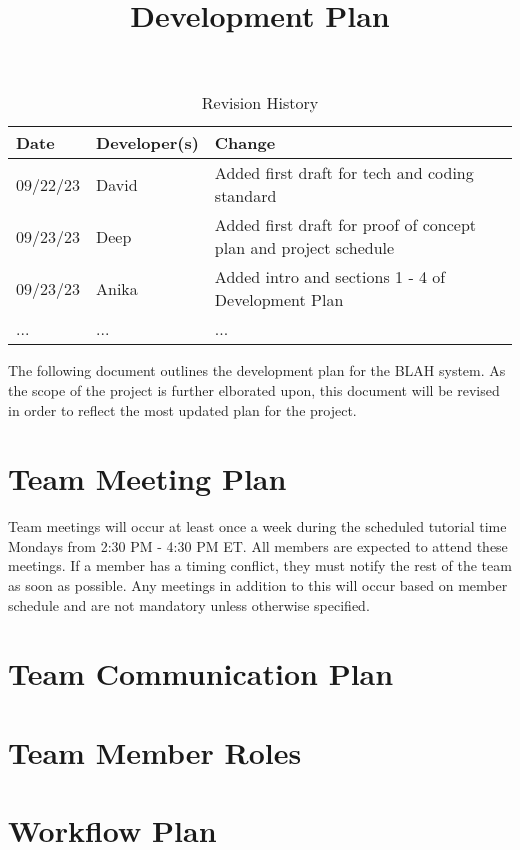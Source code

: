 \documentclass{article}
\title{Development Plan\\\progname}
\author{\authname}
\date{}
\begin{document}
\maketitle

\begin{table}[hp]
\caption{Revision History} \label{TblRevisionHistory}
\begin{tabularx}{\textwidth}{llX}
\toprule
\textbf{Date} & \textbf{Developer(s)} & \textbf{Change}\\
\midrule
09/22/23 & David & Added first draft for tech and coding standard\\
09/23/23 & Deep & Added first draft for proof of concept plan and project schedule\\
09/23/23 & Anika & Added intro and sections 1 - 4 of Development Plan\\
... & ... & ...\\
\bottomrule
\end{tabularx}
\end{table}

The following document outlines the development plan for the BLAH system.
As the scope of the project is further elborated upon, 
this document will be revised in order to reflect the most updated plan for the project.\\


\section{Team Meeting Plan}
Team meetings will occur at least once a week during the scheduled tutorial time Mondays from 2:30 PM - 4:30 PM ET.
All members are expected to attend these meetings. If a member has a timing conflict, they must notify the rest of the team as soon as possible.
Any meetings in addition to this will occur based on member schedule and are not mandatory unless otherwise specified.

\section{Team Communication Plan}

\section{Team Member Roles}

\section{Workflow Plan}
\end{document}
